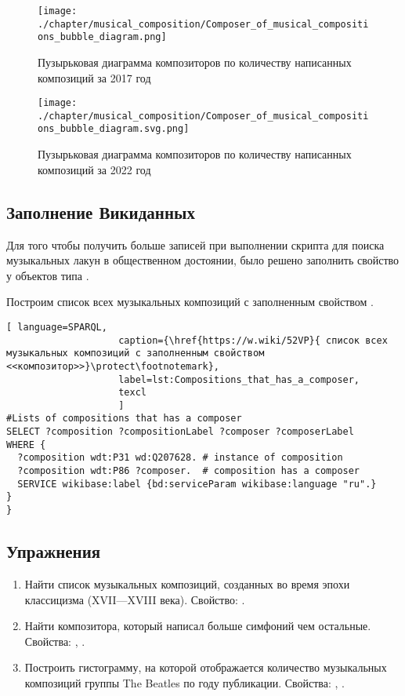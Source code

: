 \begin{figure*}
	\texttt{[image: ./chapter/musical\_composition/Composer\_of\_musical\_compositions\_bubble\_diagram.png]}
	\caption[Пузырьковая диаграмма композиторов по количеству написанных композиций за 2017 год]{Пузырьковая диаграмма композиторов по количеству написанных композиций за 2017 год}%
 	\label{fig:bubbleChart}%
\end{figure*}
\begin{figure*}
	\texttt{[image: ./chapter/musical\_composition/Composer\_of\_musical\_compositions\_bubble\_diagram.svg.png]}
	\caption[Пузырьковая диаграмма композиторов по количеству написанных композиций за 2022 год]{Пузырьковая диаграмма композиторов по количеству написанных композиций за 2022 год}%
	\label{fig:bubbleChart2}%
\end{figure*}
\newpage


\subsection{Заполнение Викиданных}
Для того чтобы получить больше записей при выполнении скрипта для поиска музыкальных лакун в общественном достоянии, было решено заполнить свойство  у объектов типа .

Построим список всех музыкальных композиций с заполненным свойством .

\begin{lstlisting}[ language=SPARQL,
                    caption={\href{https://w.wiki/52VP}{ список всех музыкальных композиций с заполненным свойством <<композитор>>}\protect\footnotemark},
                    label=lst:Compositions_that_has_a_composer,
                    texcl 
                    ]
#Lists of compositions that has a composer
SELECT ?composition ?compositionLabel ?composer ?composerLabel 
WHERE {
  ?composition wdt:P31 wd:Q207628. # instance of composition
  ?composition wdt:P86 ?composer.  # composition has a composer
  SERVICE wikibase:label {bd:serviceParam wikibase:language "ru".}
}
}
\end{lstlisting}%



\subsection{Упражнения}
\begin{enumerate}
\item Найти список музыкальных композиций, созданных во время эпохи классицизма (XVII—XVIII века).
Свойство: .
\item Найти композитора, который написал больше симфоний чем остальные.
Свойства: , .
\item Построить гистограмму, на которой отображается количество музыкальных композиций группы The Beatles по году публикации.
Свойства: , .
\end{enumerate}
